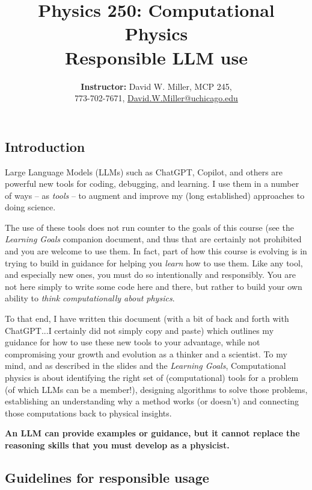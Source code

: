 \documentclass[12pt]{article}
\title{\sc Physics 250: Computational Physics\\Responsible LLM use}
\author{\textbf{Instructor:} David W. Miller, MCP 245, \\ 773-702-7671, \href{mailto:David.W.Miller@uchicago.edu}{David.W.Miller@uchicago.edu}}
\date{}
\begin{document}
\maketitle

\thispagestyle{fancy}


\subsection*{Introduction}

Large Language Models (LLMs) such as ChatGPT, Copilot, and others are powerful new tools for coding, debugging, and learning. I use them in a number of ways -- as \textit{tools} -- to augment and improve my (long established) approaches to doing science. 


The use of these tools does not run counter to the goals of this course (see the \textit{Learning Goals} companion document, and thus that are certainly not prohibited and you are welcome to use them. In fact, part of how this course is evolving is in trying to build in guidance for helping you \textit{learn} how to use them. Like any tool, and especially new ones, you must do so intentionally and responsibly. You are not here simply to write some code here and there, but rather to build your own ability to \textit{think computationally about physics}.

To that end, I have written this document (with a bit of back and forth with ChatGPT...I certainly did not simply copy and paste) which outlines my guidance for how to use these new tools to your advantage, while not compromising your growth and evolution as a thinker and a scientist. To my mind, and as described in the slides and the \textit{Learning Goals}, Computational physics is about identifying the right set of (computational) tools for a problem (of which LLMs can be a member!), designing algorithms to solve those problems, establishing an understanding why a method works (or doesn’t) and connecting those computations back to physical insights.

\textbf{An LLM can provide examples or guidance, but it cannot replace the reasoning skills that you must develop as a physicist.}


\subsection*{Guidelines for responsible usage}
\end{document}
